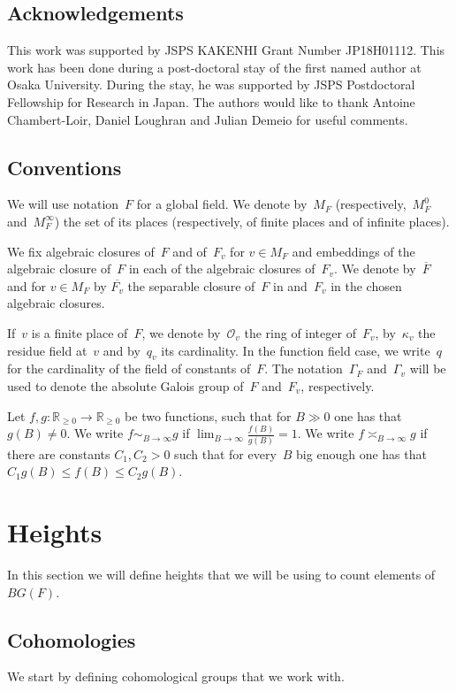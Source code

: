 \documentclass[a4paper,english,12pt]{amsart}
\newcommand{\RR}{\mathbb{R}}
\newcommand{\OO}{\mathcal O}
\newcommand{\Ov}{\mathcal O _v}
\newcommand{\vMF}{v\in M_F}
\newcommand{\AAA}{\mathbb A}
\numberwithin{equation}{subsection}
\begin{document}
\subsection{Acknowledgements} This work was supported by JSPS KAKENHI Grant Number JP18H01112. This work has been done during a post-doctoral stay of the first named author at Osaka University. During the stay, he  was supported by JSPS Postdoctoral Fellowship for Research in Japan. The authors would like to thank Antoine Chambert-Loir, Daniel Loughran and Julian Demeio for useful comments. 
\subsection{Conventions} We will use notation~$F$ for a global field. We denote by~$M_F$ (respectively,~$M_F^0$ and~$M_F^\infty$) the set of its places (respectively, of finite places and of infinite places). %

We fix algebraic closures of~$F$ and of~$F_v$ for $\vMF$ and embeddings of the algebraic closure of~$F$ in each of the algebraic closures of~$F_v$. We denote by~$\overline F$ and for $\vMF$ by $\overline{F_v}$ the separable closure of~$F$ in and~$F_v$ in the chosen algebraic closures.

If~$v$ is a finite place of~$F$, we denote by~$\Ov$ the ring of integer of~$F_v$, by~$\kappa_v$ the residue field at~$v$ and by~$q_v$ its cardinality.  In the function field case, we write~$q$ for the cardinality of the field of constants of~$F$. The notation~$\Gamma_F$ and~$\Gamma_v$ will be used to denote the absolute Galois group of~$F$ and~$F_v$, respectively.

Let $f, g:\RR_{\geq 0}\to\RR_{\geq 0}$ be two functions, such that for $B\gg 0$ one has that $g(B)\neq 0$. We write $f\sim_{B\to\infty}g$ if $\lim_{B\to\infty}\frac{f(B)}{g(B)}=1$. We write $f\asymp_{B\to\infty}g$ if there are constants $C_1, C_2>0$ such that for every~$B$ big enough one has that $ C_1 g(B)\leq f(B)\leq C_2 g(B)$.
\section{Heights} \label{sectionheights} In this section we will define heights that we will be using to count elements of~$BG(F)$.
\subsection{Cohomologies}\label{equivalenceofcat} We start by defining cohomological groups that we work with. 
\end{document}
